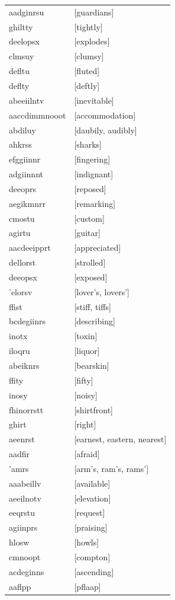 \documentclass{article}
\begin{document}
\begin{tabular}{ll}
aadginrsu & [guardians] \\
ghiltty & [tightly] \\
deelopsx & [explodes] \\
clmsuy & [clumsy] \\
defltu & [fluted] \\
deflty & [deftly] \\
abeeiilntv & [inevitable] \\
aaccdimmnooot & [accommodation] \\
abdiluy & [daubily, audibly] \\
ahkrss & [sharks] \\
efggiinnr & [fingering] \\
adgiinnnt & [indignant] \\
deeoprs & [reposed] \\
aegikmnrr & [remarking] \\
cmostu & [custom] \\
agirtu & [guitar] \\
aacdeeipprt & [appreciated] \\
dellorst & [strolled] \\
deeopsx & [exposed] \\
'elorsv & [lover's, lovers'] \\
ffist & [stiff, tiffs] \\
bcdegiinrs & [describing] \\
inotx & [toxin] \\
iloqru & [liquor] \\
abeiknrs & [bearskin] \\
ffity & [fifty] \\
inosy & [noisy] \\
fhinorrstt & [shirtfront] \\
ghirt & [right] \\
aeenrst & [earnest, eastern, nearest] \\
aadfir & [afraid] \\
'amrs & [arm's, ram's, rams'] \\
aaabeillv & [available] \\
aeeilnotv & [elevation] \\
eeqrstu & [request] \\
agiinprs & [praising] \\
hlosw & [howls] \\
cmnoopt & [compton] \\
acdeginns & [ascending] \\
aaflpp & [pflaap] \\

\end{tabular}
\end{document}
